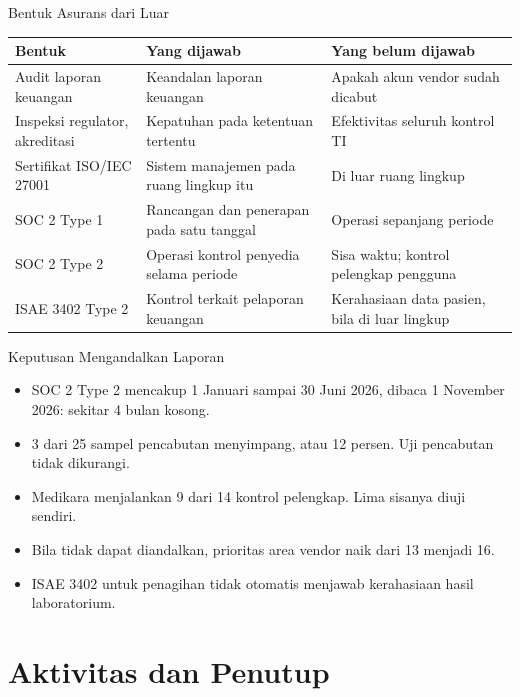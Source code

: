 \documentclass[aspectratio=169, table, 12pt]{beamer}
\begin{document}
\begin{frame}{{\Large Bentuk Asurans dari Luar}}
  \vspace{4pt}
  \scriptsize
  \begin{tabularx}{\textwidth}{|>{\raggedright\arraybackslash}p{}|>{\raggedright\arraybackslash}X|>{\raggedright\arraybackslash}X|}
    \hline
    \textbf{Bentuk} & \textbf{Yang dijawab} & \textbf{Yang belum dijawab} \\ \hline
    Audit laporan keuangan & Keandalan laporan keuangan & Apakah akun vendor sudah dicabut \\ \hline
    Inspeksi regulator, akreditasi & Kepatuhan pada ketentuan tertentu & Efektivitas seluruh kontrol
    TI \\ \hline
    Sertifikat ISO/IEC 27001 & Sistem manajemen pada ruang lingkup itu & Di luar ruang lingkup \\
    \hline
    SOC 2 Type 1 & Rancangan dan penerapan pada satu tanggal & Operasi sepanjang periode \\ \hline
    SOC 2 Type 2 & Operasi kontrol penyedia selama periode & Sisa waktu; kontrol pelengkap
    pengguna \\ \hline
    ISAE 3402 Type 2 & Kontrol terkait pelaporan keuangan & Kerahasiaan data pasien, bila di luar
    lingkup \\ \hline
  \end{tabularx}
\end{frame}

\begin{frame}{{\Large Keputusan Mengandalkan Laporan}}
  \vspace{6pt}
  \small
  \begin{itemize}
    \item SOC 2 Type 2 mencakup 1 Januari sampai 30 Juni 2026, dibaca 1 November 2026: sekitar 4
          bulan kosong.
    \item 3 dari 25 sampel pencabutan menyimpang, atau 12 persen. Uji pencabutan tidak dikurangi.
    \item Medikara menjalankan 9 dari 14 kontrol pelengkap. Lima sisanya diuji sendiri.
    \item Bila tidak dapat diandalkan, prioritas area vendor naik dari 13 menjadi 16.
    \item ISAE 3402 untuk penagihan tidak otomatis menjawab kerahasiaan hasil laboratorium.
  \end{itemize}
\end{frame}

\section{Aktivitas dan Penutup}
\end{document}
